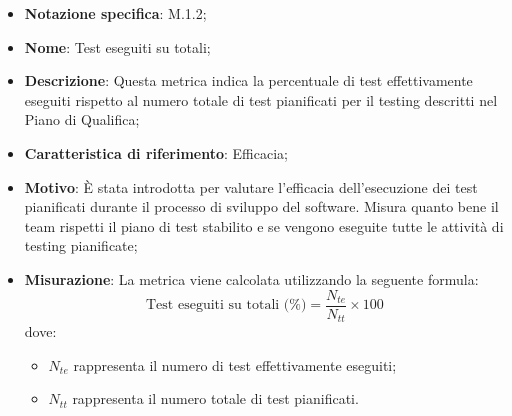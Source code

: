 \begin{itemize}
    \item \textbf{Notazione specifica}: M.1.2;
    \item \textbf{Nome}: Test eseguiti su totali;
    \item \textbf{Descrizione}: Questa metrica indica la percentuale di test effettivamente eseguiti rispetto al numero totale di test pianificati per il testing descritti nel Piano di Qualifica;
    \item \textbf{Caratteristica di riferimento}: Efficacia;
    \item \textbf{Motivo}: È stata introdotta per valutare l'efficacia dell'esecuzione dei test pianificati durante il processo di sviluppo del software. Misura quanto bene il team rispetti il piano di test stabilito e se vengono eseguite tutte le attività di testing pianificate;
    \item \textbf{Misurazione}: La metrica viene calcolata utilizzando la seguente formula:
    \[
    \text{Test eseguiti su totali (\%)} = \frac{N_{te}}{N_{tt}} \times 100
    \]
    dove:
    \begin{itemize}
        \item $N_{te}$ rappresenta il numero di test effettivamente eseguiti;
        \item $N_{tt}$ rappresenta il numero totale di test pianificati.
    \end{itemize}
   
\end{itemize}

